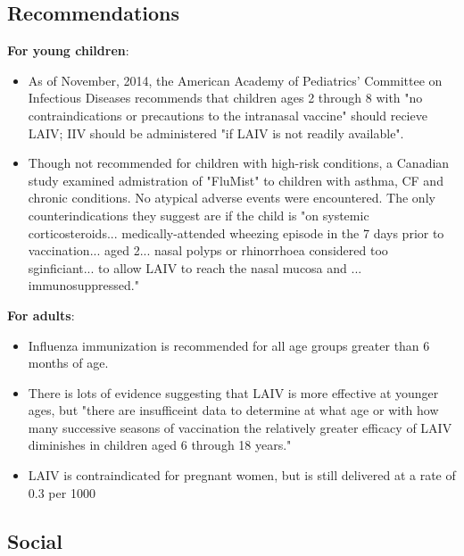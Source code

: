 \documentclass[11pt]{article}
\begin{document}
\begin{multicols}{2} 

\subsection*{Recommendations}
\textbf{For young children}:
\begin{itemize}
\item As of November, 2014, the American Academy of Pediatrics' Committee on Infectious Diseases recommends that children ages 2 through 8 with "no contraindications or precautions to the intranasal vaccine" should recieve LAIV; IIV should be administered "if LAIV is not readily available". \cite{peds2014}
\item Though not recommended for children with high-risk conditions, a Canadian study examined admistration of "FluMist" to children with asthma, CF and chronic conditions.  No atypical adverse events were encountered.  The only counterindications they suggest are if the child is "on systemic corticosteroids... medically-attended wheezing episode in the 7 days prior to vaccination... aged 2... nasal polyps or rhinorrhoea considered too sginficiant... to allow LAIV to reach the nasal mucosa and ... immunosuppressed." \cite{Quach2014} 
\end{itemize}


\textbf{For adults}:
\begin{itemize}
\item Influenza immunization is recommended for all age groups greater than 6 months of age. \cite{cdcrec2014}
\item There is lots of evidence suggesting that LAIV is more effective at younger ages, but "there are insufficeint data to determine at what age or with how many successive seasons of vaccination the relatively greater efficacy of LAIV diminishes in children aged 6 through 18 years." \cite{cdcrec2014}
\item LAIV is contraindicated for pregnant women, but is still delivered at a rate of 0.3 per 1000 \cite{Naleway2014}
\end{itemize}



\subsection*{Social}


\end{multicols}
\end{document}
